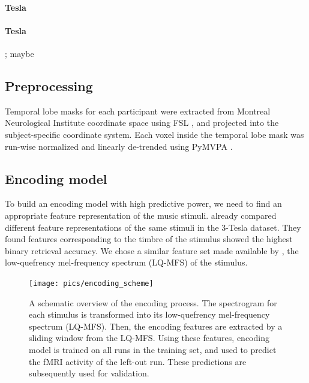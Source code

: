 \paragraph{\unit[3]{Tesla}}
%

\paragraph{\unit[7]{Tesla}}
%
\citet{HDH+2015}; maybe \citet{HBI+14}


\subsection*{Preprocessing}

Temporal lobe masks for each participant were extracted from Montreal
Neurological Institute coordinate space using FSL \citep{SJB+04,JBB+12}, and
projected into the subject-specific coordinate system.
Each voxel inside the temporal lobe mask was run-wise normalized and linearly
de-trended using PyMVPA \citep{HHS09b}. 

\subsection*{Encoding model}

To build an encoding model with high predictive power, we need to find an
appropriate feature representation of the music stimuli.  \citet{CTK+2012}
already compared different feature representations of the same stimuli in the
3-Tesla dataset. They found features corresponding to the timbre of the stimulus
showed the highest binary retrieval accuracy.
We chose a similar feature set made available by \citet{HDH+2015}, the low-quefrency
mel-frequency spectrum (LQ-MFS) of the stimulus.

\begin{figure}
  \centering
  \texttt{[image: pics/encoding\_scheme]}

  \caption{A schematic overview of the encoding process. The spectrogram for
	  each stimulus is transformed into its low-quefrency mel-frequency
	  spectrum (LQ-MFS). Then, the encoding features are extracted by a
  sliding window from the LQ-MFS. Using these features, encoding model is trained on all runs in
  the training set, and used to predict the f{MRI} activity of the left-out run.
  These predictions are subsequently used for validation.}

 \label{fig:encoding_scheme}
\end{figure}



